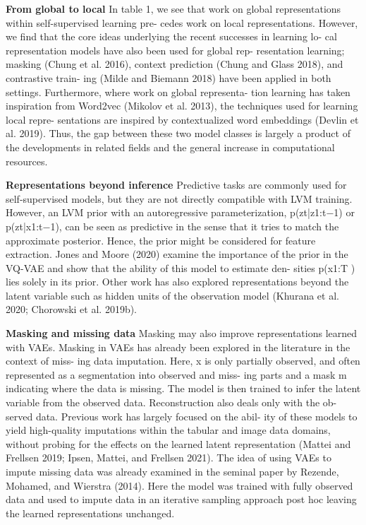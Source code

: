 \textbf{From global to local} In table 1, we see that work on global representations within self-supervised learning pre- cedes work on local representations. However, we find that the core ideas underlying the recent successes in learning lo- cal representation models have also been used for global rep- resentation learning; masking (Chung et al. 2016), context prediction (Chung and Glass 2018), and contrastive train- ing (Milde and Biemann 2018) have been applied in both settings. Furthermore, where work on global representa- tion learning has taken inspiration from Word2vec (Mikolov et al. 2013), the techniques used for learning local repre- sentations are inspired by contextualized word embeddings (Devlin et al. 2019). Thus, the gap between these two model classes is largely a product of the developments in related fields and the general increase in computational resources.

\textbf{Representations beyond inference} Predictive tasks are commonly used for self-supervised models, but they are not directly compatible with LVM training. However, an LVM prior with an autoregressive parameterization, p(zt|z1:t−1) or p(zt|x1:t−1), can be seen as predictive in the sense that it tries to match the approximate posterior. Hence, the prior might be considered for feature extraction. Jones and Moore (2020) examine the importance of the prior in the VQ-VAE and show that the ability of this model to estimate den- sities p(x1:T ) lies solely in its prior. Other work has also explored representations beyond the latent variable such as hidden units of the observation model (Khurana et al. 2020; Chorowski et al. 2019b).

\textbf{Masking and missing data} Masking may also improve representations learned with VAEs. Masking in VAEs has already been explored in the literature in the context of miss- ing data imputation. Here, x is only partially observed, and often represented as a segmentation into observed and miss- ing parts and a mask m indicating where the data is missing. The model is then trained to infer the latent variable from the observed data. Reconstruction also deals only with the ob- served data. Previous work has largely focused on the abil- ity of these models to yield high-quality imputations within the tabular and image data domains, without probing for the effects on the learned latent representation (Mattei and Frellsen 2019; Ipsen, Mattei, and Frellsen 2021). The idea of using VAEs to impute missing data was already examined in the seminal paper by Rezende, Mohamed, and Wierstra (2014). Here the model was trained with fully observed data and used to impute data in an iterative sampling approach post hoc leaving the learned representations unchanged.

